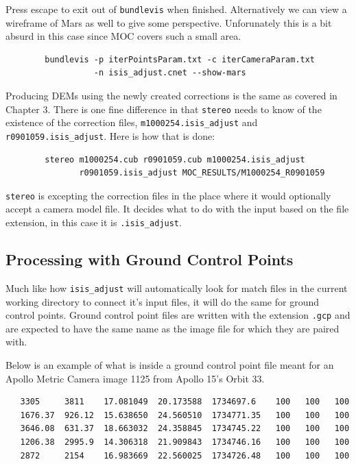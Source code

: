 Press escape to exit out of \texttt{bundlevis} when
finished. Alternatively we can view a wireframe of Mars as well to
give some perspective. Unforunately this is a bit absurd in this case
since MOC covers such a small area.

\begin{verbatim}
        bundlevis -p iterPointsParam.txt -c iterCameraParam.txt
                  -n isis_adjust.cnet --show-mars
\end{verbatim}

Producing DEMs using the newly created corrections is the same as
covered in Chapter 3. There is one fine difference in that
\texttt{stereo} needs to know of the existence of the correction
files, \verb=m1000254.isis_adjust= and
\verb=r0901059.isis_adjust=. Here is how that is done:

\begin{verbatim}
        stereo m1000254.cub r0901059.cub m1000254.isis_adjust
               r0901059.isis_adjust MOC_RESULTS/M1000254_R0901059
\end{verbatim}

\texttt{stereo} is excepting the correction files in the place where
it would optionally accept a camera model file. It decides what to do
with the input based on the file extension, in this case it is
\verb=.isis_adjust=.

\subsection{Processing with Ground Control Points}

Much like how \texttt{isis\_adjust} will automatically look for match
files in the current working directory to connect it's input files, it
will do the same for ground control points. Ground control point files
are written with the extension \verb=.gcp= and are expected to have
the same name as the image file for which they are paired with.

Below is an example of what is inside a ground control point file
meant for an Apollo Metric Camera image 1125 from Apollo 15's Orbit
33.

\begin{verbatim}
   3305     3811    17.081049  20.173588  1734697.6    100   100   100
   1676.37  926.12  15.638650  24.560510  1734771.35   100   100   100
   3646.08  631.37  18.663032  24.358845  1734745.22   100   100   100
   1206.38  2995.9  14.306318  21.909843  1734746.16   100   100   100
   2872     2154    16.983669  22.560025  1734726.48   100   100   100
\end{verbatim}


